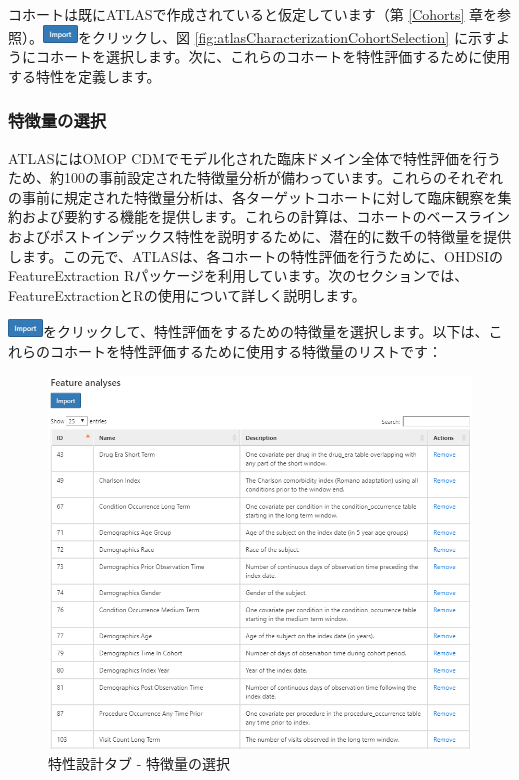 \documentclass[
  11pt]{book}
\theoremstyle{definition}
\theoremstyle{definition}
\theoremstyle{definition}
\theoremstyle{definition}
\theoremstyle{remark}
\begin{document}
コホートは既にATLASで作成されていると仮定しています（第 \ref{Cohorts} 章を参照）。\includegraphics{images/Characterization/atlasImportButton.png}をクリックし、図 \ref{fig:atlasCharacterizationCohortSelection} に示すようにコホートを選択します。次に、これらのコホートを特性評価するために使用する特性を定義します。

\subsubsection*{特徴量の選択}\label{ux7279ux5fb4ux91cfux306eux9078ux629e}

ATLASにはOMOP CDMでモデル化された臨床ドメイン全体で特性評価を行うため、約100の事前設定された特徴量分析が備わっています。これらのそれぞれの事前に規定された特徴量分析は、各ターゲットコホートに対して臨床観察を集約および要約する機能を提供します。これらの計算は、コホートのベースラインおよびポストインデックス特性を説明するために、潜在的に数千の特徴量を提供します。この元で、ATLASは、各コホートの特性評価を行うために、OHDSIのFeatureExtraction Rパッケージを利用しています。次のセクションでは、FeatureExtractionとRの使用について詳しく説明します。

\includegraphics{images/Characterization/atlasImportButton.png}をクリックして、特性評価をするための特徴量を選択します。以下は、これらのコホートを特性評価するために使用する特徴量のリストです：

\begin{figure}

{\centering \includegraphics[width=1\linewidth]{images/Characterization/atlasCharacterizationFeatureSelection} 

}

\caption{特性設計タブ - 特徴量の選択}\label{fig:atlasCharacterizationFeatureSelection}
\end{figure}
\end{document}
